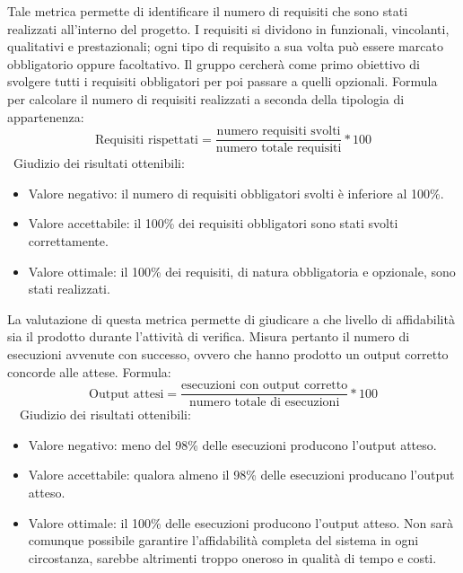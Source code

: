 \documentclass[a4paper, titlepage]{article}
\begin{document}
\label{par:req}
Tale metrica permette di identificare il numero di requisiti che sono stati realizzati all'interno del progetto.
\newline I requisiti si dividono in funzionali, vincolanti, qualitativi e prestazionali; ogni tipo di requisito a sua volta può essere marcato obbligatorio oppure facoltativo. Il gruppo cercherà come primo obiettivo di svolgere tutti i requisiti obbligatori per poi passare a quelli opzionali.
\newline Formula per calcolare il numero di requisiti realizzati a seconda della tipologia di appartenenza:
\begin{displaymath}
\mbox{Requisiti rispettati}=\frac{\mbox{numero requisiti svolti}}{\mbox{numero totale requisiti}}*100
\end{displaymath}
\
\newline Giudizio dei risultati ottenibili:
\begin{itemize}
\item Valore negativo: il numero di requisiti obbligatori svolti è inferiore al 100\%. 
\item Valore accettabile: il 100\% dei requisiti obbligatori sono stati svolti correttamente.
\item Valore ottimale: il 100\% dei requisiti, di natura obbligatoria e opzionale, sono stati realizzati.
\end{itemize}

\label{par:out}
La valutazione di questa metrica permette di giudicare a che livello di affidabilità sia il prodotto durante l'attività di verifica.
Misura pertanto il numero di esecuzioni avvenute con successo, ovvero che hanno prodotto un output corretto concorde alle attese.
\newline Formula:
\begin{displaymath}
\mbox{Output attesi}=\frac{\mbox{esecuzioni con output corretto}}{\mbox{numero totale di esecuzioni}}*100
\end{displaymath}
\
\
\newline Giudizio dei risultati ottenibili:
\begin{itemize}
\item Valore negativo: meno del 98\% delle esecuzioni producono l'output atteso.
\item Valore accettabile: qualora almeno il 98\% delle esecuzioni producano l'output atteso.
\item Valore ottimale: il 100\% delle esecuzioni producono l'output atteso. Non sarà comunque possibile garantire l'affidabilità completa del sistema in ogni circostanza, sarebbe altrimenti troppo oneroso in qualità di tempo e costi.
\end{itemize}
\end{document}
